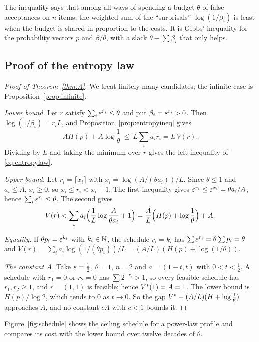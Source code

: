 The inequality says that among all ways of spending a budget $\theta$ of false acceptances on $n$ items, the weighted sum of the ``surprisals'' $\log(1/\beta_{i})$ is least when the budget is shared in proportion to the costs. It is Gibbs' inequality for the probability vectors $p$ and $\beta/\theta$, with a slack $\theta-\sum\beta_{i}$ that only helps.

\subsection{Proof of the entropy law}

\begin{proof}[Proof of Theorem~\ref{thm:A}]
We treat finitely many candidates; the infinite case is Proposition~\ref{prop:infinite}.

\emph{Lower bound.} Let $r$ satisfy $\sum_{i}\varepsilon^{r_{i}}\le\theta$ and put $\beta_{i}=\varepsilon^{r_{i}}>0$. Then $\log(1/\beta_{i})=r_{i}L$, and Proposition~\ref{prop:entropyineq} gives
\[
AH(p)+A\log\frac1\theta\ \le\ L\sum_{i}a_{i}r_{i}=L\,V(r).
\]
Dividing by $L$ and taking the minimum over $r$ gives the left inequality of \eqref{eq:entropylaw}.

\emph{Upper bound.} Let $r_{i}=\lceil x_{i}\rceil$ with $x_{i}=\log(A/(\theta a_{i}))/L$. Since $\theta\le1$ and $a_{i}\le A$, $x_{i}\ge0$, so $x_{i}\le r_{i}<x_{i}+1$. The first inequality gives $\varepsilon^{r_{i}}\le\varepsilon^{x_{i}}=\theta a_{i}/A$, hence $\sum_{i}\varepsilon^{r_{i}}\le\theta$. The second gives
\[
V(r)<\sum_{i}a_{i}\Bigl(\frac1L\log\frac{A}{\theta a_{i}}+1\Bigr)=\frac AL\Bigl(H(p)+\log\frac1\theta\Bigr)+A .
\]

\emph{Equality.} If $\theta p_{i}=\varepsilon^{k_{i}}$ with $k_{i}\in\mathbb{N}$, the schedule $r_{i}=k_{i}$ has $\sum\varepsilon^{r_{i}}=\theta\sum p_{i}=\theta$ and $V(r)=\sum_{i}a_{i}\log(1/(\theta p_{i}))/L=(A/L)(H(p)+\log(1/\theta))$.

\emph{The constant $A$.} Take $\varepsilon=\frac12$, $\theta=1$, $n=2$ and $a=(1-t,t)$ with $0<t<\frac12$. A schedule with $r_{1}=0$ or $r_{2}=0$ has $\sum2^{-r_{i}}>1$, so every feasible schedule has $r_{1},r_{2}\ge1$, and $r=(1,1)$ is feasible; hence $V^{*}(1)=A=1$. The lower bound is $H(p)/\log2$, which tends to $0$ as $t\to0$. So the gap $V^{*}-(A/L)(H+\log\frac1\theta)$ approaches $A$, and no constant $cA$ with $c<1$ bounds it.
\end{proof}

Figure~\ref{fig:schedule} shows the ceiling schedule for a power-law profile and compares its cost with the lower bound over twelve decades of $\theta$.

